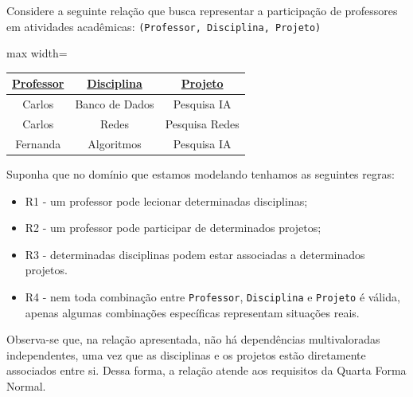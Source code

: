 \begin{tcolorbox}[breakable, colback=blue!5,colframe=blue!40!black,title=Situação exemplo]
    Considere a seguinte relação que busca representar a participação de professores em atividades acadêmicas: \texttt{(Professor, Disciplina, Projeto)}

    \vspace{0.4cm}

    \centering
    \renewcommand{\arraystretch}{1.2}

    \begin{adjustbox}{max width=\textwidth}
    \begin{tabular}{|c|c|c|}
    \hline
    \textbf{\underline{Professor}} & \textbf{\underline{Disciplina}} & \textbf{\underline{Projeto}} \\ \hline
    Carlos & Banco de Dados & Pesquisa IA \\ \hline
    Carlos & Redes & Pesquisa Redes \\ \hline
    Fernanda & Algoritmos & Pesquisa IA \\ \hline
    \end{tabular}
\end{adjustbox}
    \vspace{0.3cm}

    \vspace{0.4cm}

    \justify

    Suponha que no domínio que estamos modelando tenhamos as seguintes regras:
    \begin{itemize}
        \item R1 - um professor pode lecionar determinadas disciplinas;
        \item R2 - um professor pode participar de determinados projetos;
        \item R3 - determinadas disciplinas podem estar associadas a determinados projetos.
        \item R4 - nem toda combinação entre \texttt{Professor}, \texttt{Disciplina} e \texttt{Projeto} é válida, apenas algumas combinações específicas representam situações reais.
    \end{itemize}

    Observa-se que, na relação apresentada, não há dependências multivaloradas independentes, uma vez que as disciplinas e os projetos estão diretamente associados entre si. Dessa forma, a relação atende aos requisitos da Quarta Forma Normal.


\end{tcolorbox}
